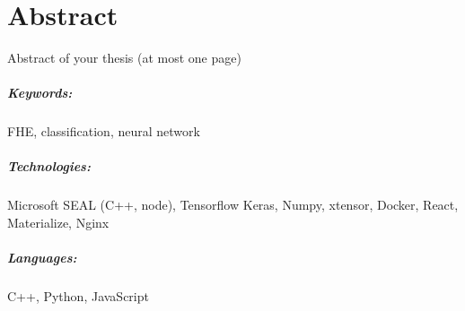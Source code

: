 \chapter*{Abstract}
Abstract of your thesis (at most one page)

\Blindtext[2]

\paragraph{Keywords:}
FHE, classification, neural network

\paragraph{Technologies:}
Microsoft SEAL (C++, node),
Tensorflow Keras,
Numpy,
xtensor,
Docker,
React,
Materialize,
Nginx

\paragraph{Languages:}
C++, Python, JavaScript
